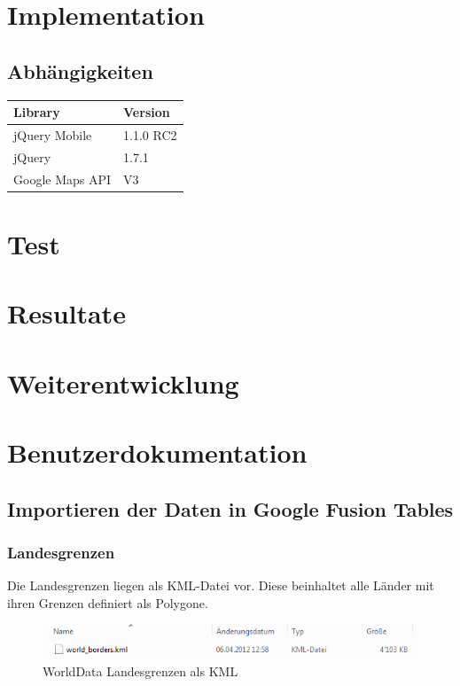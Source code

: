 \section{Implementation}
\subsection{Abhängigkeiten}
\begin{tabular}{|l|l|}
\hline 
Library & Version \\ 
\hline 
jQuery Mobile & 1.1.0 RC2 \\ 
\hline 
jQuery & 1.7.1 \\ 
\hline 
Google Maps API & V3 \\ 
\hline 
\end{tabular} 

\section{Test}

\section{Resultate}

\section{Weiterentwicklung}

\section{Benutzerdokumentation}
\subsection{Importieren der Daten in Google Fusion Tables}
\subsubsection{Landesgrenzen}
Die Landesgrenzen liegen als KML-Datei vor. Diese beinhaltet alle Länder mit ihren Grenzen definiert als Polygone.

\begin{figure}[htbp]
	\centering
	\includegraphics{images/usecase1-worlddata/worlddata-worldborders_kml.png}
	\caption{WorldData Landesgrenzen als KML}
	\label{worlddata-worldborders_kml}
\end{figure}

